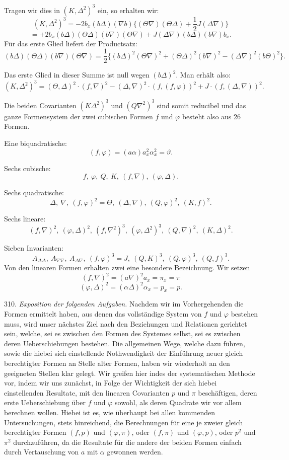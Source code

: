 \documentclass[11pt]{article}
\providecommand{\weberpage}[1]{}
\let\Delta\varDelta
\let\Theta\varTheta
\begin{document}
Tragen wir dies in $(K, \Delta^2)^3$ ein, so erhalten wir:
\[
(K, \Delta^2)^3 = -2b_x(b\Delta)(\nabla b)\{(\Theta\nabla)(\Theta\Delta)+\frac{1}{2}J(\Delta\nabla)\}
\]
\[
= +2b_x(b\Delta)(\Theta\Delta)(b\nabla)(\Theta\nabla) + J(\Delta\nabla)(b\Delta)(b\nabla)b_x.
\]
Für das erste Glied liefert der Productsatz:
\[
(b\Delta)(\Theta\Delta)(b\nabla)(\Theta\nabla) = \frac{1}{2}\{(b\Delta)^2(\Theta\nabla)^2+(\Theta\Delta)^2(b\nabla)^2-(\Delta\nabla)^2(b\Theta)^2\}.
\]

Das erste Glied in dieser Summe ist null wegen $(b\Delta)^2$. Man erhält
also:
\[
(K, \Delta^2)^3 = (\Theta, \Delta)^2\cdot(f, \nabla)^2 - (\Delta, \nabla)^2\cdot(f, (f, \varphi))^2 + J\cdot(f, (\Delta, \nabla))^2.
\]

Die beiden Covarianten $(K\Delta^2)^3$ und $(Q\nabla^2)^3$ sind somit
reducibel und das ganze Formensystem der zwei cubischen Formen $f$ und
$\varphi$ besteht also aus 26 Formen.

Eine biquadratische:
\[
(f, \varphi) = (a\alpha)a_x^2\alpha_x^2 = \vartheta.
\]

Sechs cubische:
\[
f,\ \varphi,\ Q,\ K,\ (f, \nabla),\ (\varphi, \Delta).
\]

Sechs quadratische:
\[
\Delta,\ \nabla,\ (f, \varphi)^2 = \Theta,\ (\Delta, \nabla),\ (Q, \varphi)^2,\ (K, f)^2.
\]

Sechs lineare:
\[
(f, \nabla)^2,\ (\varphi, \Delta)^2,\ (f, \nabla^2)^3,\ (\varphi, \Delta^2)^3,\ (Q, \nabla)^2,\ (K, \Delta)^2.
\]

Sieben Invarianten:
\[
A_{\Delta\Delta},\ A_{\nabla\nabla},\ A_{\Delta\nabla},\ (f, \varphi)^3 = J,\ (Q, K)^3,\ (Q, \varphi)^3,\ (Q, f)^3.
\]
Von den linearen Formen erhalten zwei eine besondere Bezeichnung.
Wir setzen
\[
(f, \nabla)^2 = (a\nabla)^2a_x = \pi_x = \pi
\]
\[
(\varphi, \Delta)^2 = (\alpha\Delta)^2\alpha_x = p_x = p.
\]


\weberpage{334}

310. \textit{Exposition der folgenden Aufgaben.} Nachdem wir im
Vorhergehenden die Formen ermittelt haben, aus denen das vollständige
System von $f$ und $\varphi$ bestehen muss, wird unser nächstes Ziel nach
den Beziehungen und Relationen gerichtet sein, welche, sei es zwischen
den Formen des Systemes selbst, sei es zwischen deren Ueberschiebungen
bestehen. Die allgemeinen Wege, welche dazu führen, sowie die hiebei
sich einstellende Nothwendigkeit der Einführung neuer gleich
berechtigter Formen an Stelle alter Formen, haben wir wiederholt an
den geeigneten Stellen klar gelegt. Wir greifen hier indes der
systematischen Methode vor, indem wir uns zunächst, in Folge der
Wichtigkeit der sich hiebei einstellenden Resultate, mit den linearen
Covarianten $p$ und $\pi$ beschäftigen, deren erste Ueberschiebung über
$f$ und $\varphi$ sowohl, als deren Quadrate wir vor allem berechnen
wollen. Hiebei ist es, wie überhaupt bei allen kommenden
Untersuchungen, stets hinreichend, die Berechnungen für eine je zweier
gleich berechtigter Formen $(f, p)$ und $(\varphi, \pi)$, oder $(f, \pi)$
und $(\varphi, p)$, oder $p^2$ und $\pi^2$ durchzuführen, da die
Resultate für die andere der beiden Formen einfach durch Vertauschung
von $a$ mit $\alpha$ gewonnen werden.
\end{document}
